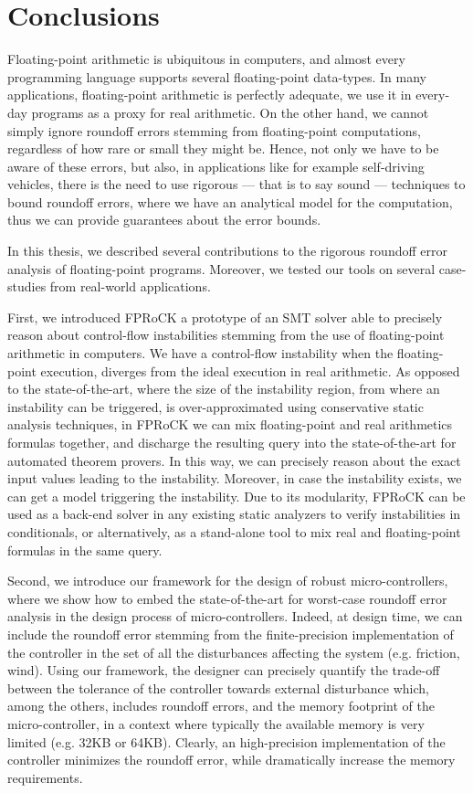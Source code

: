 
\chapter{Conclusions}
\label{sec:conclusion}
%
Floating-point arithmetic is ubiquitous in computers, and almost every programming language supports several floating-point data-types.
%
In many applications, floating-point arithmetic is perfectly adequate, we use it in every-day programs as a proxy for real arithmetic.
%
On the other hand, we cannot simply ignore roundoff errors stemming from floating-point computations, regardless of how rare or small they might be.
%
Hence, not only we have to be aware of these errors, but also, in applications like for example self-driving vehicles, there is the need to use rigorous --- that is to say sound --- techniques to bound roundoff errors, where we have an analytical model for the computation, thus we can provide guarantees about the error bounds.
%

In this thesis, we described several contributions to the rigorous roundoff error analysis of floating-point programs.
%
Moreover, we tested our tools on several case-studies from real-world applications.
%

First, we introduced FPRoCK a prototype of an SMT solver able to precisely reason about control-flow instabilities stemming from the use of floating-point arithmetic in computers.
%
We have a control-flow instability when the floating-point execution, diverges from the ideal execution in real arithmetic.
%
As opposed to the state-of-the-art, where the size of the instability region, from where an instability can be triggered, is over-approximated using conservative static analysis techniques, in FPRoCK we can mix floating-point and real arithmetics formulas together, and discharge the resulting query into the state-of-the-art for automated theorem provers. 
%
In this way, we can precisely reason about the exact input values leading to the instability. 
%
Moreover, in case the instability exists, we can get a model triggering the instability.
%
Due to its modularity, FPRoCK can be used as a back-end solver in any existing static analyzers to verify instabilities in conditionals, or alternatively, as a stand-alone tool to mix real and floating-point formulas in the same query.
%

Second, we introduce our framework for the design of robust micro-controllers, where we show how to embed the state-of-the-art for worst-case roundoff error analysis in the design process of micro-controllers.
%
Indeed, at design time, we can include the roundoff error stemming from the finite-precision implementation of the controller in the set of all the disturbances affecting the system (e.g. friction, wind).
%
Using our framework, the designer can precisely quantify the trade-off between the tolerance of the controller towards external disturbance which, among the others, includes roundoff errors, and the memory footprint of the micro-controller, in a context where typically the available memory is very limited (e.g. 32KB or 64KB).
%
Clearly, an high-precision implementation of the controller minimizes the roundoff error, while dramatically increase the memory requirements. 
%

